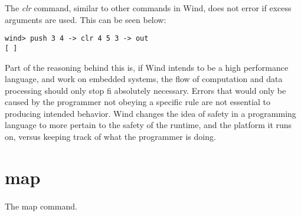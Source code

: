 \par The \emph{clr} command, similar to other commands in Wind, does not error if excess arguments are used. This can be seen below:

\begin{verbatim}
wind> push 3 4 -> clr 4 5 3 -> out
[ ]
\end{verbatim}

\par Part of the reasoning behind this is, if Wind intends to be a high performance language, and work on embedded systems, the flow of computation and data processing should only stop fi absolutely necessary. Errors that would only be caused by the programmer not obeying a specific rule  are not essential to producing intended behavior. Wind changes the idea of safety in a programming language to more pertain to the safety of the runtime, and the platform it runs on, versus keeping track of what the programmer is doing.

\section{map}

\paragraph{  } The map command.

